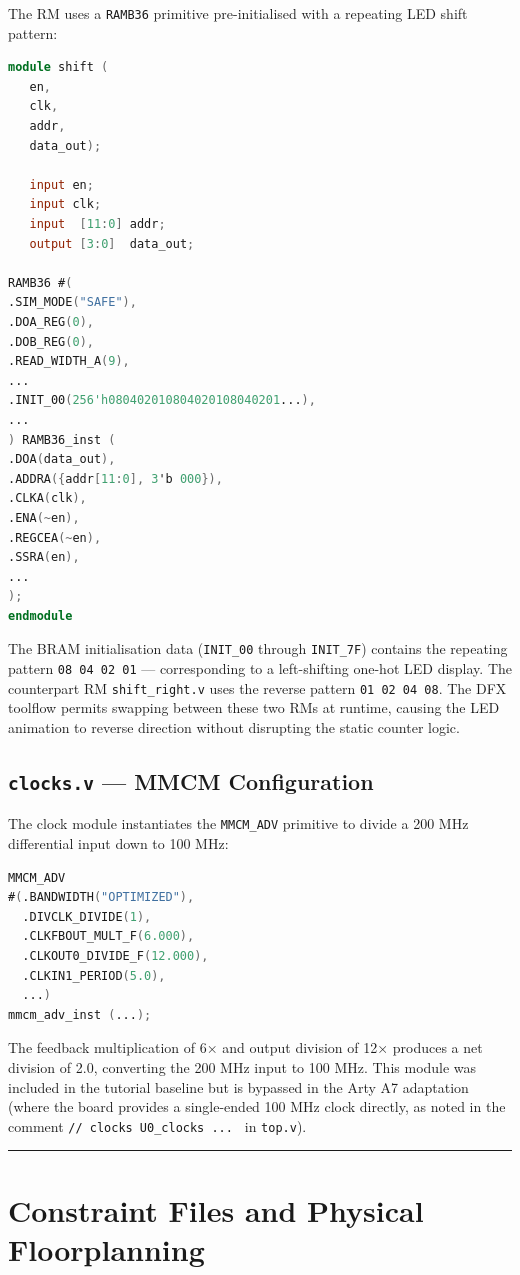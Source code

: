 The RM uses a \texttt{RAMB36} primitive pre-initialised with a repeating LED shift pattern:

\begin{lstlisting}[style=mystyle, language=Verilog]
module shift (
   en,
   clk,
   addr,
   data_out);

   input en;
   input clk;
   input  [11:0] addr;
   output [3:0]  data_out;

RAMB36 #(
.SIM_MODE("SAFE"),
.DOA_REG(0),
.DOB_REG(0),
.READ_WIDTH_A(9),
...
.INIT_00(256'h080402010804020108040201...),
...
) RAMB36_inst (
.DOA(data_out),
.ADDRA({addr[11:0], 3'b 000}),
.CLKA(clk),
.ENA(~en),
.REGCEA(~en),
.SSRA(en),
...
);
endmodule
\end{lstlisting}

The BRAM initialisation data (\texttt{INIT\_00} through \texttt{INIT\_7F}) contains the repeating pattern \texttt{08 04 02 01} — corresponding to a left-shifting one-hot LED display. The counterpart RM \texttt{shift\_right.v} uses the reverse pattern \texttt{01 02 04 08}. The DFX toolflow permits swapping between these two RMs at runtime, causing the LED animation to reverse direction without disrupting the static counter logic.

\subsection{\texttt{clocks.v} — MMCM Configuration}

The clock module instantiates the \texttt{MMCM\_ADV} primitive to divide a 200 MHz differential input down to 100 MHz:

\begin{lstlisting}[style=mystyle, language=Verilog]
MMCM_ADV
#(.BANDWIDTH("OPTIMIZED"),
  .DIVCLK_DIVIDE(1),
  .CLKFBOUT_MULT_F(6.000),
  .CLKOUT0_DIVIDE_F(12.000),
  .CLKIN1_PERIOD(5.0),
  ...)
mmcm_adv_inst (...);
\end{lstlisting}

The feedback multiplication of 6× and output division of 12× produces a net division of 2.0, converting the 200 MHz input to 100 MHz. This module was included in the tutorial baseline but is bypassed in the Arty A7 adaptation (where the board provides a single-ended 100 MHz clock directly, as noted in the comment \texttt{// clocks U0\_clocks ... } in \texttt{top.v}).

\vspace{0.4em}\hrule\vspace{0.4em}

\section{Constraint Files and Physical Floorplanning}

